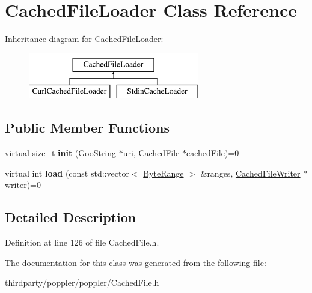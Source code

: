 \hypertarget{class_cached_file_loader}{}\section{Cached\+File\+Loader Class Reference}
\label{class_cached_file_loader}
Inheritance diagram for Cached\+File\+Loader\+:\begin{figure}[H]
\begin{center}
\leavevmode
\includegraphics[height=2.000000cm]{class_cached_file_loader}
\end{center}
\end{figure}
\subsection*{Public Member Functions}
\begin{DoxyCompactItemize}
\item 
\mbox{\label{class_cached_file_loader_ac6c7077d4171b587b7abfbebc5478db2}} 
virtual size\+\_\+t {\bfseries init} (\hyperlink{class_goo_string}{Goo\+String} $\ast$uri, \hyperlink{class_cached_file}{Cached\+File} $\ast$cached\+File)=0
\item 
\mbox{\label{class_cached_file_loader_a7142d8dea7fb98cab943105eff3210bb}} 
virtual int {\bfseries load} (const std\+::vector$<$ \hyperlink{struct___byte_range}{Byte\+Range} $>$ \&ranges, \hyperlink{class_cached_file_writer}{Cached\+File\+Writer} $\ast$writer)=0
\end{DoxyCompactItemize}


\subsection{Detailed Description}


Definition at line 126 of file Cached\+File.\+h.



The documentation for this class was generated from the following file\+:\begin{DoxyCompactItemize}
\item 
thirdparty/poppler/poppler/Cached\+File.\+h\end{DoxyCompactItemize}
